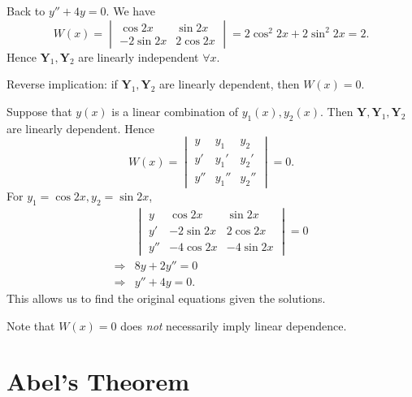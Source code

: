 \documentclass[10pt]{article}
\begin{document}
    \begin{example}
        Back to $ y''+4y=0 $. We have 
        \[
            W(x)=\begin{vmatrix}
                \cos 2x& \sin 2x\\
                -2 \sin 2x& 2 \cos 2x
            \end{vmatrix}=2 \cos^2 2x+ 2 \sin^2 2x=2
        .\]
        Hence $ \mathbf{Y}_1,\mathbf{Y}_2 $ are linearly independent $ \forall x $.
    \end{example}
    \begin{remark}
        Reverse implication: if $ \mathbf{Y}_1,  \mathbf{Y}_2 $ are linearly dependent, then $ W(x)=0 $.

        Suppose that $ y(x) $ is a linear combination of $y_1(x),y_2(x)$. Then $\mathbf{Y}, \mathbf{Y}_1, \mathbf{Y}_2 $ are linearly dependent. Hence 
        \[
            W(x)=\begin{vmatrix}
                y&y_1&y_2\\
                y'&y_1'&y_2'\\
                y''&y_1''&y_2''
            \end{vmatrix}=0
        .\]
        For $ y_1= \cos 2x, y_2=\sin 2x $,
        \[
            \begin{aligned}
                &\begin{vmatrix}
                    y&\cos 2x&\sin 2x\\
                    y'&-2 \sin 2x&2 \cos 2x\\
                    y''&-4 \cos 2x&-4 \sin 2x
                \end{vmatrix}=0\\
                \Longrightarrow & 8y+2y''=0\\
                \Longrightarrow & y''+4y=0.
            \end{aligned}
        \]
        This allows us to find the original equations given the solutions.
    \end{remark}
    \begin{remark}
        Note that $W(x)=0$ does \textit{not} necessarily imply linear dependence.
    \end{remark}
    \section{Abel's Theorem}
\end{document}
